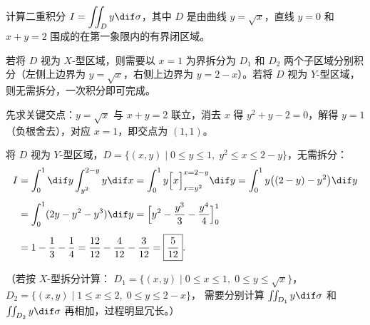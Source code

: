 \documentclass[answer]{THUExam}
\begin{document}
\newpage

\begin{problem}
计算二重积分 $\displaystyle I=\iint_D y\dif\sigma$，其中 $D$ 是由曲线 $y=\sqrt{x}$，直线 $y=0$ 和 $x+y=2$ 围成的在第一象限内的有界闭区域。
\end{problem}
\begin{note}
若将 $D$ 视为 $X$-型区域，则需要以 $x=1$ 为界拆分为 $D_1$ 和 $D_2$ 两个子区域分别积分（左侧上边界为 $y=\sqrt{x}$，右侧上边界为 $y=2-x$）。若将 $D$ 视为 $Y$-型区域，则无需拆分，一次积分即可完成。

先求关键交点：$y=\sqrt{x}$ 与 $x+y=2$ 联立，消去 $x$ 得 $y^2+y-2=0$，解得 $y=1$（负根舍去），对应 $x=1$，即交点为 $(1,1)$。

\begin{center}
\end{center}
\end{note}
\begin{solution}
将 $D$ 视为 $Y$-型区域，$D=\{(x,y)\mid 0\le y\le 1,\; y^2\le x\le 2-y\}$，无需拆分：
\begin{align*}
I &= \int_0^1\dif y\int_{y^2}^{2-y} y\dif x
   = \int_0^1 y\Bigl[x\Bigr]_{x=y^2}^{x=2-y}\dif y
   = \int_0^1 y\bigl((2-y)-y^2\bigr)\dif y \\[4pt]
  &= \int_0^1 (2y-y^2-y^3)\dif y
   = \Bigl[y^2-\frac{y^3}{3}-\frac{y^4}{4}\Bigr]_0^1 \\[4pt]
  &= 1-\frac{1}{3}-\frac{1}{4}
   = \frac{12}{12}-\frac{4}{12}-\frac{3}{12}
   = \boxed{\dfrac{5}{12}}.
\end{align*}

（若按 $X$-型拆分计算：
$D_1=\{(x,y)\mid 0\le x\le 1,\;0\le y\le\sqrt{x}\}$，
$D_2=\{(x,y)\mid 1\le x\le 2,\;0\le y\le 2-x\}$，
需要分别计算 $\iint_{D_1}y\dif\sigma$ 和 $\iint_{D_2}y\dif\sigma$ 再相加，过程明显冗长。）
\end{solution}
\end{document}
